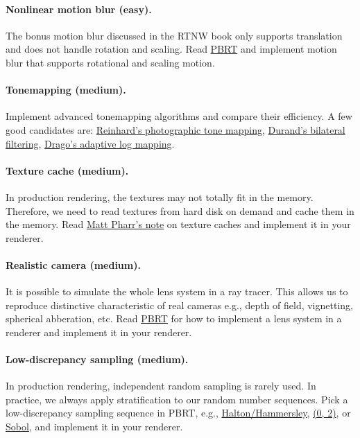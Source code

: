 \paragraph{Nonlinear motion blur (easy).}
The bonus motion blur discussed in the RTNW book only supports translation and does not handle rotation and scaling. Read \href{https://www.pbr-book.org/3ed-2018/Geometry_and_Transformations/Animating_Transformations}{PBRT} and implement motion blur that supports rotational and scaling motion.

\paragraph{Tonemapping (medium).}
Implement advanced tonemapping algorithms and compare their efficiency. A few good candidates are: \href{https://www-old.cs.utah.edu/docs/techreports/2002/pdf/UUCS-02-001.pdf}{Reinhard's photographic tone mapping}, \href{http://people.csail.mit.edu/fredo/PUBLI/Siggraph2002/}{Durand's bilateral filtering}, \href{https://resources.mpi-inf.mpg.de/tmo/logmap/}{Drago's adaptive log mapping}.

\paragraph{Texture cache (medium).}
In production rendering, the textures may not totally fit in the memory. Therefore, we need to read textures from hard disk on demand and cache them in the memory. Read \href{https://pbrt.org/texcache.pdf}{Matt Pharr's note} on texture caches and implement it in your renderer.

\paragraph{Realistic camera (medium).}
It is possible to simulate the whole lens system in a ray tracer. This allows us to reproduce distinctive characteristic of real cameras e.g., depth of field, vignetting, spherical abberation, etc. Read \href{https://www.pbr-book.org/3ed-2018/Camera_Models/Realistic_Cameras}{PBRT} for how to implement a lens system in a renderer and implement it in your renderer.

\paragraph{Low-discrepancy sampling (medium).}
In production rendering, independent random sampling is rarely used. In practice, we always apply stratification to our random number sequences. Pick a low-discrepancy sampling sequence in PBRT, e.g., \href{https://www.pbr-book.org/3ed-2018/Sampling_and_Reconstruction/The_Halton_Sampler.html}{Halton/Hammersley}, \href{https://www.pbr-book.org/3ed-2018/Sampling_and_Reconstruction/(0,_2)-Sequence_Sampler.html}{(0, 2)}, or \href{https://www.pbr-book.org/3ed-2018/Sampling_and_Reconstruction/Sobol_Sampler.html}{Sobol}, and implement it in your renderer.

